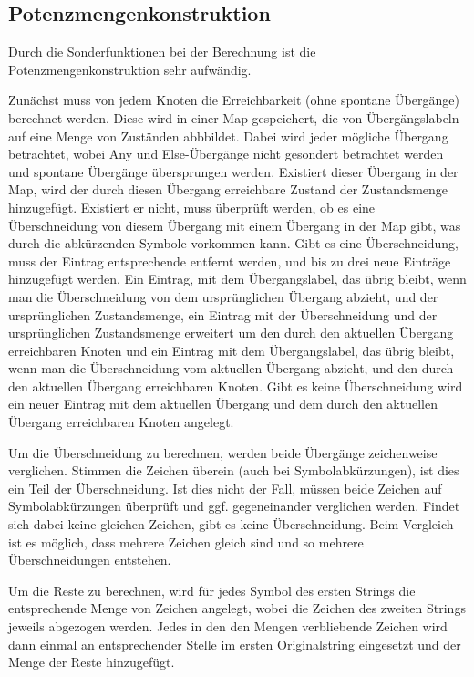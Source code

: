 \subsection{Potenzmengenkonstruktion}
Durch die Sonderfunktionen bei der Berechnung ist die Potenzmengenkonstruktion sehr aufwändig.

Zunächst muss von jedem Knoten die Erreichbarkeit (ohne spontane Übergänge) berechnet werden. Diese wird in einer Map gespeichert, die von Übergängslabeln auf eine Menge von Zuständen abbbildet. Dabei wird jeder mögliche Übergang betrachtet, wobei Any und Else-Übergänge nicht gesondert betrachtet werden und spontane Übergänge übersprungen werden. Existiert dieser Übergang in der Map, wird der durch diesen Übergang erreichbare Zustand der Zustandsmenge hinzugefügt. Existiert er nicht, muss überprüft werden, ob es eine Überschneidung von diesem Übergang mit einem Übergang in der Map gibt, was durch die abkürzenden Symbole vorkommen kann. Gibt es eine Überschneidung, muss der Eintrag entsprechende entfernt werden, und bis zu drei neue Einträge hinzugefügt werden. Ein Eintrag, mit dem Übergangslabel, das übrig bleibt, wenn man die Überschneidung von dem ursprünglichen Übergang abzieht, und der ursprünglichen Zustandsmenge, ein Eintrag mit der Überschneidung und der ursprünglichen Zustandsmenge erweitert um den durch den aktuellen Übergang erreichbaren Knoten und ein Eintrag mit dem Übergangslabel, das übrig bleibt, wenn man die Überschneidung vom aktuellen Übergang abzieht, und den durch den aktuellen Übergang erreichbaren Knoten. Gibt es keine Überschneidung wird ein neuer Eintrag mit dem aktuellen Übergang und dem durch den aktuellen Übergang erreichbaren Knoten angelegt.

Um die Überschneidung zu berechnen, werden beide Übergänge zeichenweise verglichen. Stimmen die Zeichen überein (auch bei Symbolabkürzungen), ist dies ein Teil der Überschneidung. Ist dies nicht der Fall, müssen beide Zeichen auf Symbolabkürzungen überprüft und ggf. gegeneinander verglichen werden. Findet sich dabei keine gleichen Zeichen, gibt es keine Überschneidung. Beim Vergleich ist es möglich, dass mehrere Zeichen gleich sind und so mehrere Überschneidungen entstehen. %

Um die Reste zu berechnen, wird für jedes Symbol des ersten Strings die entsprechende Menge von Zeichen angelegt, wobei die Zeichen des zweiten Strings jeweils abgezogen werden. Jedes in den den Mengen verbliebende Zeichen wird dann einmal an entsprechender Stelle im ersten Originalstring eingesetzt und der Menge der Reste hinzugefügt.

